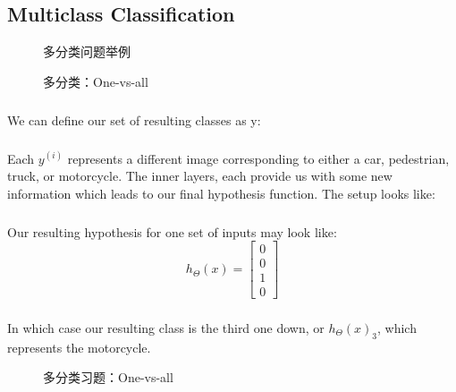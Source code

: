 \documentclass{article}
\begin{document}
\begin{CJK}{UTF8}{gbsn}
\subsection{Multiclass Classification}
\begin{figure}[H]
\caption{多分类问题举例}
\label{fig:433}
\end{figure}
\begin{figure}[H]
\caption{多分类：One-vs-all}
\label{fig:434}
\end{figure}
\subparagraph{}
We can define our set of resulting classes as y:
\begin{figure}[H]
\label{fig:445}
\end{figure}
\subparagraph{}
Each $y^{(i)}$ represents a different image corresponding to either a car, pedestrian, truck, or motorcycle. The inner layers, each provide us with some new information which leads to our final hypothesis function. The setup looks like:
\begin{figure}[H]
\label{fig:446}
\end{figure}
\subparagraph{}
Our resulting hypothesis for one set of inputs may look like:
\begin{equation}
h_\Theta(x)=\left[\begin{matrix}
0\\0\\1\\0
\end{matrix}\right]
\end{equation}
\subparagraph{}
In which case our resulting class is the third one down, or $h_\Theta{(x)}_3$, which represents the motorcycle.
\begin{figure}[H]
\caption{多分类习题：One-vs-all}
\label{fig:440}
\end{figure}
\end{CJK}
\end{document}
